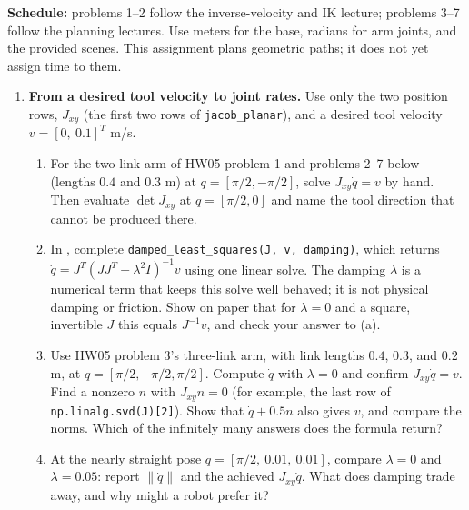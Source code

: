 

\textbf{Schedule:} problems 1--2 follow the inverse-velocity and IK lecture;
problems 3--7 follow the planning lectures.
Use meters for the base, radians for arm joints, and the provided scenes.
This assignment plans geometric paths; it does not yet assign time to them.

\begin{enumerate}
\item \textbf{From a desired tool velocity to joint rates.}
Use only the two position rows, $J_{xy}$ (the first two rows of
\texttt{jacob\_planar}), and a desired tool velocity $v=[0,\ 0.1]^T$ m/s.
\begin{enumerate}
\item For the two-link arm of HW05 problem 1 and problems 2--7 below (lengths
$0.4$ and $0.3$ m) at $q=[\pi/2,-\pi/2]$, solve
$J_{xy}\dot q=v$ by hand. Then evaluate $\det J_{xy}$ at $q=[\pi/2,0]$ and
name the tool direction that cannot be produced there.
\item In , complete
\texttt{damped\_least\_squares(J, v, damping)}, which returns
$\dot q=J^T(JJ^T+\lambda^2I)^{-1}v$ using one linear solve. The damping
$\lambda$ is a numerical term that keeps this solve well behaved; it is not
physical damping or friction. Show on paper that
for $\lambda=0$ and a square, invertible $J$ this equals $J^{-1}v$, and check
your answer to (a).
\item Use HW05 problem 3's three-link arm, with link lengths $0.4$, $0.3$,
and $0.2$ m, at $q=[\pi/2,-\pi/2,\pi/2]$. Compute $\dot q$ with
$\lambda=0$ and confirm $J_{xy}\dot q=v$. Find a nonzero $n$ with
$J_{xy}n=0$ (for example, the last row of \texttt{np.linalg.svd(J)[2]}).
Show that $\dot q+0.5n$ also gives $v$, and compare the norms. Which of the
infinitely many answers does the formula return?
\item At the nearly straight pose $q=[\pi/2,\ 0.01,\ 0.01]$, compare
$\lambda=0$ and $\lambda=0.05$: report $\|\dot q\|$ and the achieved
$J_{xy}\dot q$. What does damping trade away, and why might a robot prefer it?
\end{enumerate}


\end{enumerate}
